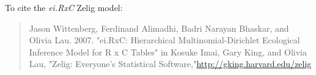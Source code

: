 To cite the \emph{ ei.RxC } Zelig model:
 \begin{verse}
 Jason Wittenberg, Ferdinand Alimadhi, Badri Narayan Bhaskar, and Olivia Lau. 2007. "ei.RxC: Hierarchical Multinomial-Dirichlet Ecological Inference Model for R x C Tables" in Kosuke Imai, Gary King, and Olivia Lau, "Zelig: Everyone's Statistical Software,"\url{http://gking.harvard.edu/zelig} 
\end{verse}